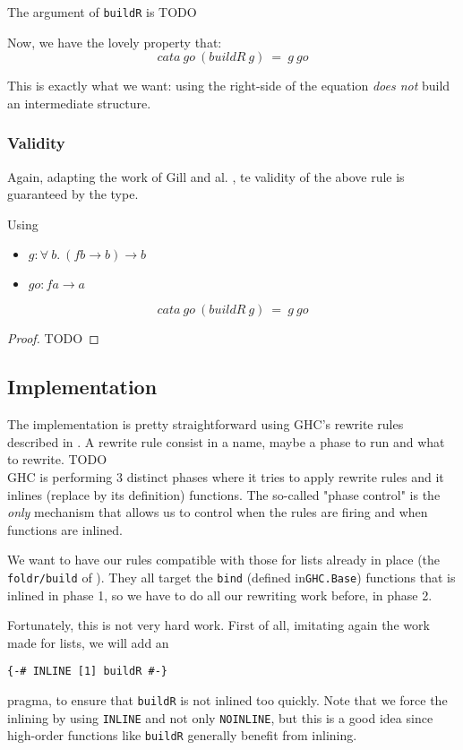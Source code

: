 \documentclass[format=sigplan]{acmart}
\newcommand{\minline}[1]{\texttt{#1}}
\begin{document}
The argument of \minline{buildR} is TODO

Now, we have the lovely property that:
$$cata\ go\ (buildR\ g)\ =\ g\ go$$

This is exactly what we want: using the right-side of the equation \emph{does not}
build an intermediate structure.

\subsubsection{Validity}
Again, adapting the work of Gill and al. \cite{Gill:1993:SCD:165180.165214}, te validity of the above rule is guaranteed by the type.

\begin{theorem}
Using
\begin{itemize}
	\item $g : \forall\ b.\ (f b \to b) \to b$
	\item $go : f a \to a $
\end{itemize}
$$cata\ go\ (buildR\ g)\ =\ g\ go$$
\end{theorem}
\begin{proof}
	TODO
\end{proof}

\subsection{Implementation}
The implementation is pretty straightforward using GHC's rewrite rules described in \cite{pbr}. A rewrite rule consist in a name, maybe a phase to run and what to rewrite. TODO\\
GHC is performing 3 distinct phases where it tries to apply rewrite rules and it inlines (replace by its definition) functions. The so-called "phase control" is the \emph{only} mechanism that allows us to control when the rules are firing and when functions are inlined.

We want to have our rules compatible with those for lists already in place (the \verb|foldr/build| of \cite{Gill:1993:SCD:165180.165214}). They all target the \minline{bind} (defined in\verb|GHC.Base|) functions that is inlined in phase 1, so we have to do all our rewriting work before, in phase 2.

Fortunately, this is not very hard work. First of all, imitating again the work made for lists, we will add an 
\begin{verbatim}
{-# INLINE [1] buildR #-}
\end{verbatim}
pragma, to ensure that \minline{buildR} is not inlined too quickly. Note that we force the inlining by using \verb|INLINE| and not only \verb|NOINLINE|, but this is a good idea since high-order functions like \minline{buildR} generally benefit from inlining. 
\end{document}
